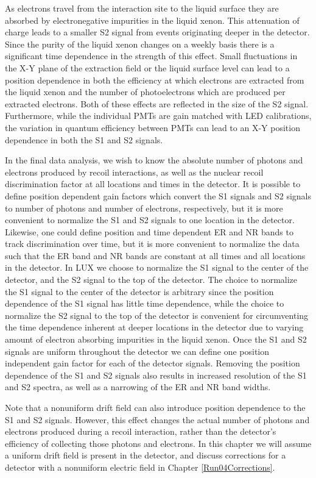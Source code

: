 \documentclass[a4paper,12pt]{article}
\begin{document}
{As electrons travel from the interaction site to the liquid surface they are absorbed by electronegative impurities in the liquid xenon.  This attenuation of charge leads to a smaller S2 signal from events originating deeper in the detector.  Since the purity of the liquid xenon changes on a weekly basis there is a significant time dependence in the strength of this effect. Small fluctuations in the X-Y plane of the extraction field or the liquid surface level can lead to a position dependence in both the efficiency at which electrons are extracted from the liquid xenon and the number of photoelectrons which are produced per extracted electrons.  Both of these effects are reflected in the size of the S2 signal.  Furthermore, while the individual PMTs are gain matched with LED calibrations, the variation in quantum efficiency between PMTs can lead to an X-Y position dependence in both the S1 and S2 signals.

In the final data analysis, we wish to know the absolute number of photons and electrons produced by recoil interactions, as well as the nuclear recoil discrimination factor at all locations and times in the detector.  It is possible to define position dependent gain factors which convert the S1 signals and S2 signals to number of photons and number of electrons, respectively, but it is more convenient to normalize the S1 and S2 signals to one location in the detector.   Likewise, one could define position and time dependent ER and NR bands to track discrimination over time, but it is more convenient to normalize the data such that the ER band and NR bands are constant at all times and all locations in the detector.  In LUX we choose to normalize the S1 signal to the center of the detector, and the S2 signal to the top of the detector.  The choice to normalize the S1 signal to the center of the detector is arbitrary since the position dependence of the S1 signal has little time dependence, while the choice to normalize the S2 signal to the top of the detector is convenient for circumventing the time dependence inherent at deeper locations in the detector due to varying amount of electron absorbing impurities in the liquid xenon.  Once the S1 and S2 signals are uniform throughout the detector we can define one position independent gain factor for each of the detector signals.  Removing the position dependence of the S1 and S2 signals also results in increased resolution of the S1 and S2 spectra, as well as a narrowing of the ER and NR band widths.


Note that a nonuniform drift field can also introduce position dependence to the S1 and S2 signals.  However, this effect changes the actual number of photons and electrons produced during a recoil interaction, rather than the detector's efficiency of collecting those photons and electrons.  In this chapter we will assume a uniform drift field is present in the detector, and discuss corrections for a detector with a nonuniform electric field in Chapter \ref{Run04Corrections}.

}
\end{document}
